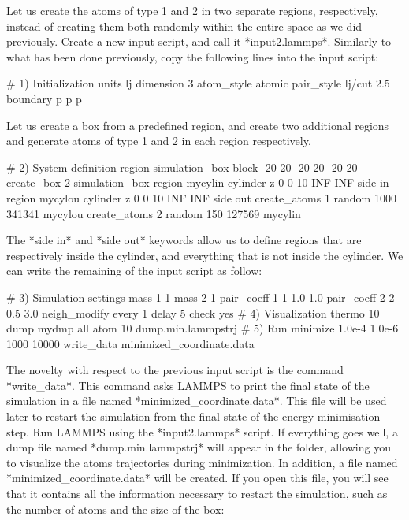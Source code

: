 Let us create the atoms of type 1 and 2 in two separate
regions, respectively, instead of creating them both randomly 
within the entire space as we did previously. Create a new input script, and call
it *input2.lammps*. Similarly to what has been done previously, copy the following lines
into the input script:



\begin{lcverbatim}
# 1) Initialization
units lj
dimension 3
atom_style atomic
pair_style lj/cut 2.5
boundary p p p
\end{lcverbatim}

Let us create a box from a predefined region,
and create two additional regions and generate
atoms of type 1 and 2 in each region respectively.



\begin{lcverbatim}
# 2) System definition
region simulation_box block -20 20 -20 20 -20 20
create_box 2 simulation_box
region mycylin cylinder z 0 0 10 INF INF side in
region mycylou cylinder z 0 0 10 INF INF side out
create_atoms 1 random 1000 341341 mycylou
create_atoms 2 random 150 127569 mycylin
\end{lcverbatim}

The *side in* and *side out* keywords
allow us to define regions that are respectively inside the
cylinder, and everything that is not inside the cylinder.
We can write the remaining of the input script as follow:



\begin{lcverbatim}
# 3) Simulation settings
mass 1 1
mass 2 1
pair_coeff 1 1 1.0 1.0
pair_coeff 2 2 0.5 3.0
neigh_modify every 1 delay 5 check yes
# 4) Visualization
thermo 10
dump mydmp all atom 10 dump.min.lammpstrj
# 5) Run
minimize 1.0e-4 1.0e-6 1000 10000
write_data minimized_coordinate.data
\end{lcverbatim}

The novelty with respect to the previous
input script is the command *write_data*. This command
asks LAMMPS to print the final state of the simulation in
a file named *minimized_coordinate.data*. This file will
be used later to restart the simulation from the final
state of the energy minimisation step.
Run LAMMPS using the *input2.lammps* script. If everything
goes well, a dump file named *dump.min.lammpstrj* will
appear in the folder, allowing you to visualize the atoms
trajectories during minimization. In
addition, a file named *minimized_coordinate.data* will be
created. If you open this file, you will see that it
contains all the information necessary to restart the
simulation, such as the number of atoms and the size of
the box:



